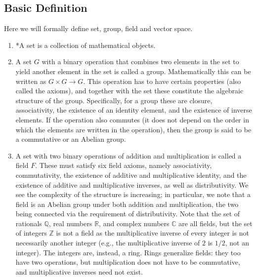 \documentclass[a4paper,12pt]{report}
\begin{document}
\begin{appendices}
\chapter{Basic Definition}

Here we will formally define set, group, field and vector space.

\begin{enumerate}
\item  *A set is a collection of mathematical objects.

\item  A set \( G \) with a binary operation that combines two elements in the set to yield another element in the set is called a group. Mathematically this can be written as \( G \times G \to G \). This operation has to have certain properties (also called the axioms), and together with the set these constitute the algebraic structure of the group. Specifically, for a group these are closure, associativity, the existence of an identity element, and the existence of inverse elements. If the operation also commutes (\ie  it does not depend on the order in which the elements are written in the operation), then the group is said to be a commutative or an Abelian group.

\item  A set with two binary operations of addition and multiplication is called a field \( F \). These must satisfy six field axioms, namely associativity, commutativity, the existence of additive and multiplicative identity, and the existence of additive and multiplicative inverses, as well as distributivity. We see the complexity of the structure is increasing; in particular, we note that a field is an Abelian group under both addition and multiplication, the two being connected via the requirement of distributivity. Note that the set of rationals \( \mathbb{Q} \), real numbers \( \mathbb{R} \), and complex numbers \( \mathbb{C} \) are all fields, but the set of integers \( \mathbb{Z} \) is not a field as the multiplicative inverse of every integer is not necessarily another integer (e.g., the multiplicative inverse of \( 2 \) is \( 1/2 \), not an integer). The integers are, instead, a ring. Rings generalize fields: they too have two operations, but multiplication does not have to be commutative, and multiplicative inverses need not exist.


\end{enumerate}
\end{appendices}
\end{document}
